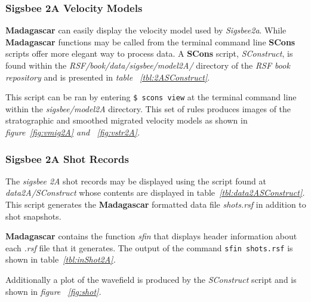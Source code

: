 \subsubsection{Sigsbee 2A Velocity Models}
\noindent
\textbf{Madagascar} can easily display the velocity model used by \emph{Sigsbee2a}.  While \textbf{Madagascar} functions may be called from the terminal command line \textbf{SCons} scripts offer more elegant way to process data.  A \textbf{SCons} script, \emph{SConstruct}, is found within the \emph{RSF/book/data/sigsbee/model2A/} directory of the \emph{RSF book repository} and is presented in \emph{table ~\ref{tbl:2ASConstruct}}. 

{
\tiny

\normalsize
}

\noindent
This script can be ran by entering \texttt{\$ scons view} at the terminal command line within the \emph{sigsbee/model2A} directory.  This set of rules produces images of the stratographic and smoothed migrated velocity models as shown in \emph{figure~\ref{fig:vmig2A} and ~\ref{fig:vstr2A}.}  


\subsubsection{Sigsbee 2A Shot Records}
\noindent
The \emph{sigsbee 2A} shot records may be displayed using the script found at \emph{data2A/SConstruct} whose contents are displayed in table\emph{~\ref{tbl:data2ASConstruct}.}  This script generates the \textbf{Madagascar} formatted data file \emph{shots.rsf} in addition to shot snapshots.
  
{
\tiny

\normalsize
}
\noindent
\textbf{Madagascar} contains the function \emph{sfin} that displays header information about each \emph{.rsf} file that it generates.  The output of the command \texttt{sfin shots.rsf} is shown in table\emph{~\ref{tbl:inShot2A}.}

{
\tiny

\normalsize
}
Additionally a plot of the wavefield is produced by the \emph{SConstruct} script and is shown in \emph{figure ~\ref{fig:shot}.}

